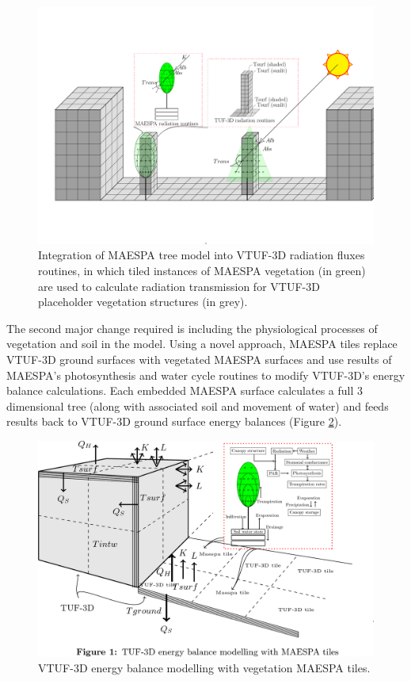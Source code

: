\documentclass[final,3p,times,authoryear]{elsarticle}
\begin{document}
\begin{figure}[!htbp]
 \includegraphics[trim = 15mm 41mm 0mm 31mm, clip, scale=0.45]{images/TUFWithMaespaVegRadiation.pdf}  
 \caption{Integration of MAESPA tree model into VTUF-3D radiation fluxes routines, in which tiled instances of MAESPA vegetation (in green) are used to calculate radiation transmission for VTUF-3D placeholder vegetation structures (in grey)\label{fig:TUFWithMaespaVegRadiation}.}
\end{figure}

The second major change required is including the physiological processes of vegetation and soil in the model. Using a novel approach, MAESPA tiles replace VTUF-3D ground surfaces with vegetated MAESPA surfaces and use results of MAESPA's photosynthesis and water cycle routines to modify VTUF-3D's energy balance calculations. Each embedded MAESPA surface calculates a full 3 dimensional tree (along with associated soil and movement of water) and feeds results back to VTUF-3D ground surface energy balances (Figure \ref{fig:TUFWithMaespaInsert}). 

\begin{figure}[!htbp]
 \includegraphics[trim = 0mm 14mm 22mm 0.0mm, clip, scale=0.25]{images/TUFWithMaespaInsert.png}
 \caption{VTUF-3D energy balance modelling with vegetation MAESPA tiles\label{fig:TUFWithMaespaInsert}.}
\end{figure}
\end{document}
